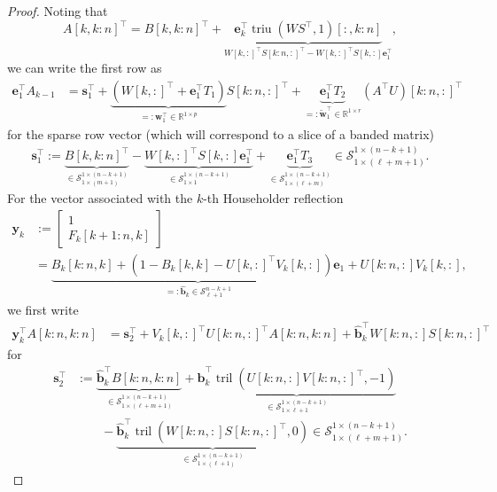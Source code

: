 \documentclass[a4paper,fleqn]{cas-sc}
\def\bbR{{\mathbb R}}
\def\calS{{\mathcal S}}
\def\bfy{{\mathbf y}}
\def\bfe{{\mathbf e}}
\def\bfb{{\mathbf b}}
\def\bfs{{\mathbf s}}
\def\bfw{{\mathbf w}}
\DeclareMathOperator{\triu}{triu}
\DeclareMathOperator{\tril}{tril}
\begin{document}
\begin{proof}
Noting that
\[
 A[k,k\!:\!n]^\top = 
B[k,k\!:\!n]^\top + \underbrace{\bfe_k^\top \triu(W S^\top,1)[:,k\!:\!n]}_{ 
    W[k,:]^\top S[k:n,:]^\top   - W[k,:]^\top S[k,:] \bfe_1^\top
},
\]
we can write the first row as
\begin{align*}
\bfe_1^\top A_{k-1} &= \bfs_1^\top  + \underbrace{(W[k,:]^\top + \bfe_1^\top T_1)}_{=:\bfw_1^\top \in \bbR^{1 \times p}} S[k\!:\!n,:]^\top  + \underbrace{\bfe_1^\top T_2}_{=:\tilde\bfw_1^\top \in \bbR^{1 \times r}} (A^\top U)[k\!:\!n,:]^\top
\end{align*}
for the sparse row vector (which will correspond to a slice of a banded matrix)
\begin{align*}
\bfs_1^\top  :=
    \underbrace{B[k,k\!:\!n]^\top}_{\in \calS_{1 \times(m+1)}^{1\times(n-k+1)}}  - \underbrace{W[k,:]^\top S[k,:] \bfe_1^\top}_{\in \calS_{1 \times 1}^{1\times(n-k+1)}} + \underbrace{\bfe_1^\top T_3 }_{\in \calS_{1 \times (\ell+m)}^{1 \times (n-k+1)}} \in \calS_{1 \times (\ell+m+1)}^{1 \times (n-k+1)}.
\end{align*}
For the vector associated with the $k$-th Householder reflection
\begin{equation}
\begin{aligned} \label{eq:y_k}
\bfy_k &:= \begin{bmatrix}1 \\
    F_k[k+1\!:\!n,k]
\end{bmatrix} \\
&=\underbrace{B_k[k\!:\!n,k]+(1-B_k[k,k] - U[k,:]^\top V_k[k,:]) \bfe_1}_{=: \hat \bfb_k \in \calS_{\ell+1}^{n-k+1}} + U[k\!:\!n,:] V_k[k,:],
\end{aligned}
\end{equation}
we first write
\begin{align} \label{eq:yA}
\bfy_k^\top A[k\!:\!n,k\!:\!n] &=  \bfs_2^\top  + V_k[k,:]^\top U[k\!:\!n,:]^\top A[k\!:\!n,k\!:\!n]   +  \hat \bfb_k^\top W[k\!:\!n,:]  S[k\!:\!n,:]^\top
\end{align}
for 
\begin{align*}
\bfs_2^\top &:= \underbrace{\hat \bfb_k^\top B[k\!:\!n,k\!:\!n]}_{\in \calS_{1 \times(\ell+m+1)}^{1\times(n-k+1)}} + \underbrace{\hat \bfb_k^\top \tril(U[k\!:\!n,:]  V[k\!:\!n,:]^\top,-1)}_{\in \calS_{1 \times \ell+1}^{1\times(n-k+1)}}
\\& \qquad - \underbrace{\hat \bfb_k^\top \tril(W[k\!:\!n,:]  S[k\!:\!n,:]^\top,0)}_{\in \calS_{1 \times (\ell+1)}^{1\times(n-k+1)}} \in  \calS_{1 \times(\ell+m+1)}^{1\times(n-k+1)}.
\end{align*}


\end{proof}
\end{document}
